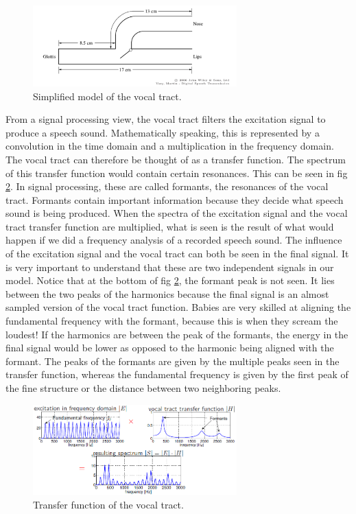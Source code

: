 \begin{figure}
    \includegraphics[width=0.7\textwidth]{Pictures/Chapter1_Lesson3/vocalTractSimple1-eps-converted-to.pdf}
    \caption{Simplified model of the vocal tract.}
    \label{tubeModel}
\end{figure}

From a signal processing view, the vocal tract filters the excitation signal to produce a speech sound. Mathematically speaking, this is represented by a convolution in the time domain and a multiplication in the frequency domain. The vocal tract can therefore be thought of as a transfer function. The spectrum of this transfer function would contain certain resonances. This can be seen in fig \ref{transFunc}. In signal processing, these are called formants, the resonances of the vocal tract. Formants contain important information because they decide what speech sound is being produced.  When the spectra of the excitation signal and the vocal tract transfer function are multiplied, what is seen is the result of what would happen if we did a frequency analysis of a recorded speech sound. The influence of the excitation signal and the vocal tract can both be seen in the final signal. It is very important to understand that these are two independent signals in our model. Notice that at the bottom of fig \ref{transFunc}, the formant peak is not seen. It lies between the two peaks of the harmonics because the final signal is an almost sampled version of the vocal tract function. Babies are very skilled at aligning the fundamental frequency with the formant, because this is when they scream the loudest! If the harmonics are between the peak of the formants, the energy in the final signal would be lower as opposed to the harmonic being aligned with the formant.  The peaks of the formants are given by the multiple peaks seen  in the transfer function, whereas the fundamental frequency is given by the first peak of the fine structure or the distance between two neighboring peaks.\\

\begin{figure}
    \includegraphics[width=0.7\textwidth]{Pictures/Chapter1_Lesson3/Transferfunc.png}
    \caption{Transfer function of the vocal tract.}
     \label{transFunc}
\end{figure}

